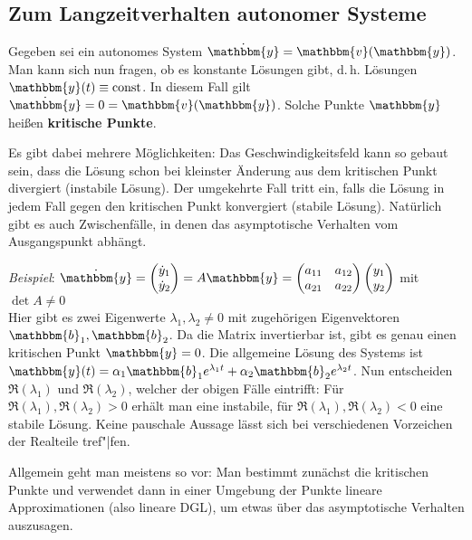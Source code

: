 \subsection{%
    Zum Langzeitverhalten autonomer Systeme%
}

Gegeben sei ein autonomes System
$\dot{\mathbbm{y}} = \mathbbm{v}(\mathbbm{y})$.
Man kann sich nun fragen, ob es konstante Lösungen gibt, d.\,h.
Lösungen $\mathbbm{y}(t) \equiv \const$.
In diesem Fall gilt $\dot{\mathbbm{y}} = 0 = \mathbbm{v}(\mathbbm{y})$.
Solche Punkte $\mathbbm{y}$ heißen \textbf{kritische Punkte}.

Es gibt dabei mehrere Möglichkeiten:
Das Geschwindigkeitsfeld kann so gebaut sein, dass die Lösung schon bei
kleinster Änderung aus dem kritischen Punkt divergiert (instabile Lösung).
Der umgekehrte Fall tritt ein, falls die Lösung in jedem Fall gegen den
kritischen Punkt konvergiert (stabile Lösung).
Natürlich gibt es auch Zwischenfälle, in denen das asymptotische Verhalten
vom Ausgangspunkt abhängt.

\emph{Beispiel}:
$\dot{\mathbbm{y}} = \begin{pmatrix}\dot{y}_1 \\ \dot{y}_2\end{pmatrix} =
A\mathbbm{y} = \begin{pmatrix}a_{11} & a_{12} \\ a_{21} & a_{22}\end{pmatrix}
\begin{pmatrix}y_1 \\ y_2\end{pmatrix}$ mit $\det A \not= 0$ \\
Hier gibt es zwei Eigenwerte $\lambda_1, \lambda_2 \not= 0$ mit zugehörigen
Eigenvektoren $\mathbbm{b}_1, \mathbbm{b}_2$.
Da die Matrix invertierbar ist, gibt es genau einen kritischen Punkt
$\mathbbm{y} = 0$.
Die allgemeine Lösung des Systems ist
$\mathbbm{y}(t) = \alpha_1 \mathbbm{b}_1 e^{\lambda_1 t} +
\alpha_2 \mathbbm{b}_2 e^{\lambda_2 t}$.
Nun entscheiden $\Re(\lambda_1)$ und $\Re(\lambda_2)$, welcher der obigen
Fälle eintrifft:
Für $\Re(\lambda_1), \Re(\lambda_2) > 0$ erhält man eine instabile,
für $\Re(\lambda_1), \Re(\lambda_2) < 0$ eine stabile Lösung.
Keine pauschale Aussage lässt sich bei verschiedenen Vorzeichen der Realteile
tref"|fen.

Allgemein geht man meistens so vor:
Man bestimmt zunächst die kritischen Punkte und verwendet dann in einer
Umgebung der Punkte lineare Approximationen (also lineare DGL), um etwas
über das asymptotische Verhalten auszusagen.

